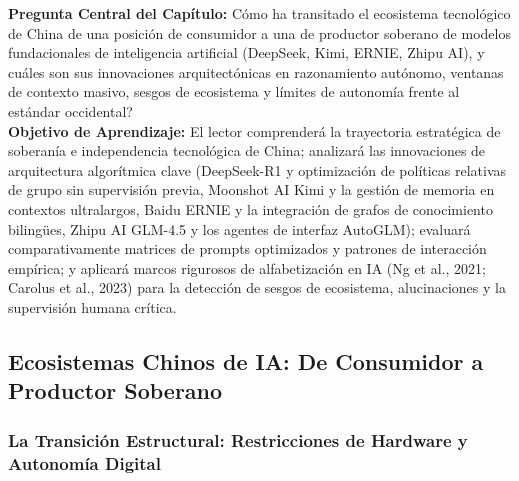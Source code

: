 \begin{cajabeige}
\textbf{Pregunta Central del Capítulo:} \textquestiondown Cómo ha transitado el ecosistema tecnológico de China de una posición de consumidor a una de productor soberano de modelos fundacionales de inteligencia artificial (DeepSeek, Kimi, ERNIE, Zhipu AI), y cuáles son sus innovaciones arquitectónicas en razonamiento autónomo, ventanas de contexto masivo, sesgos de ecosistema y límites de autonomía frente al estándar occidental?\\[0.3cm]
\textbf{Objetivo de Aprendizaje:} El lector comprenderá la trayectoria estratégica de soberanía e independencia tecnológica de China; analizará las innovaciones de arquitectura algorítmica clave (DeepSeek-R1 y optimización de políticas relativas de grupo sin supervisión previa, Moonshot AI Kimi y la gestión de memoria en contextos ultralargos, Baidu ERNIE y la integración de grafos de conocimiento bilingües, Zhipu AI GLM-4.5 y los agentes de interfaz AutoGLM); evaluará comparativamente matrices de prompts optimizados y patrones de interacción empírica; y aplicará marcos rigurosos de alfabetización en IA (Ng et al., 2021; Carolus et al., 2023) para la detección de sesgos de ecosistema, alucinaciones y la supervisión humana crítica.
\end{cajabeige}


\vspace{0.4cm}

\subsection{Ecosistemas Chinos de IA: De Consumidor a Productor Soberano}

\subsubsection{La Transición Estructural: Restricciones de Hardware y Autonomía Digital}

